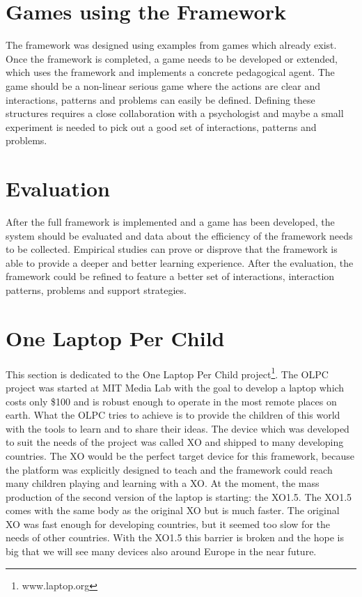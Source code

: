\section{Games using the Framework}
The framework was designed using examples from games which already exist.
Once the framework is completed, a game needs to be developed or extended, which uses the
framework and implements a concrete pedagogical agent. The game should be a
non-linear serious game where the actions are clear and interactions, patterns
and problems can easily be defined. Defining these structures requires a close
collaboration with a psychologist and maybe a small experiment is needed to
pick out a good set of interactions, patterns and problems.

\section{Evaluation}
After the full framework is implemented and a game has been developed, the
system should be evaluated and data about the efficiency of the
framework needs to be collected. Empirical studies can prove or disprove that the framework
is able to provide a deeper and better learning experience. After the
evaluation, the framework could be refined to feature a better set of
interactions, interaction patterns, problems and support strategies.

\section{One Laptop Per Child}
\label{olpc}
This section is dedicated to the One Laptop Per Child
project\footnote{www.laptop.org}. The OLPC project was started at MIT Media
Lab with the goal to develop a laptop which costs only \${100} and is robust
enough to operate in the most remote places on earth. What the OLPC tries to
achieve is to provide the children of this world with the tools to learn and
to share their ideas. The device which was developed to suit the needs of the
project was called XO and shipped to many developing countries. The XO would be
the perfect target device for this framework, because the platform was
explicitly designed to teach and the framework could reach many children
playing and learning with a XO. At the moment, the mass production of the
second version of the laptop is starting: the XO1.5. The XO1.5 comes with the same body as the
original XO but is much faster. The original XO was fast enough for developing
countries, but it seemed too slow for the needs of other countries. With the
XO1.5 this barrier is broken and the hope is big that we will see many devices also around
Europe in the near future.

